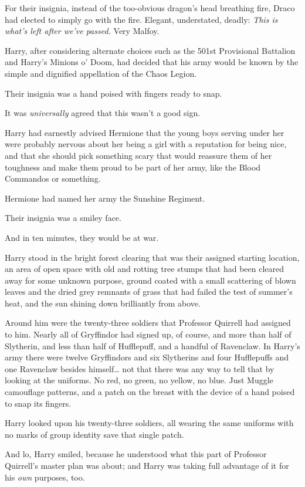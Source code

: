 For their insignia, instead of the too-obvious dragon's head breathing fire, 
Draco had elected to simply go with the fire. Elegant, understated, deadly: 
\emph{This is what's left after we've passed.} Very Malfoy.

Harry, after considering alternate choices such as the 501st Provisional 
Battalion and Harry's Minions o' Doom, had decided that his army would be known 
by the simple and dignified appellation of the Chaos Legion.

Their insignia was a hand poised with fingers ready to snap.

It was \emph{universally} agreed that this wasn't a good sign.

Harry had earnestly advised Hermione that the young boys serving under her were 
probably nervous about her being a girl with a reputation for being nice, and 
that she should pick something scary that would reassure them of her toughness 
and make them proud to be part of her army, like the Blood Commandos or 
something.

Hermione had named her army the Sunshine Regiment.

Their insignia was a smiley face.

And in ten minutes, they would be at war.

Harry stood in the bright forest clearing that was their assigned starting 
location, an area of open space with old and rotting tree stumps that had been 
cleared away for some unknown purpose, ground coated with a small scattering of 
blown leaves and the dried grey remnants of grass that had failed the test of 
summer's heat, and the sun shining down brilliantly from above.

Around him were the twenty-three soldiers that Professor Quirrell had assigned 
to him. Nearly all of Gryffindor had signed up, of course, and more than half 
of Slytherin, and less than half of Hufflepuff, and a handful of Ravenclaw. In 
Harry's army there were twelve Gryffindors and six Slytherins and four 
Hufflepuffs and one Ravenclaw besides himself{\ldots} not that there was any 
way to tell that by looking at the uniforms. No red, no green, no yellow, no 
blue. Just Muggle camouflage patterns, and a patch on the breast with the 
device of a hand poised to snap its fingers.

Harry looked upon his twenty-three soldiers, all wearing the same uniforms with 
no marks of group identity save that single patch.

And lo, Harry smiled, because he understood what this part of Professor 
Quirrell's master plan was about; and Harry was taking full advantage of it for 
his \emph{own} purposes, too.

